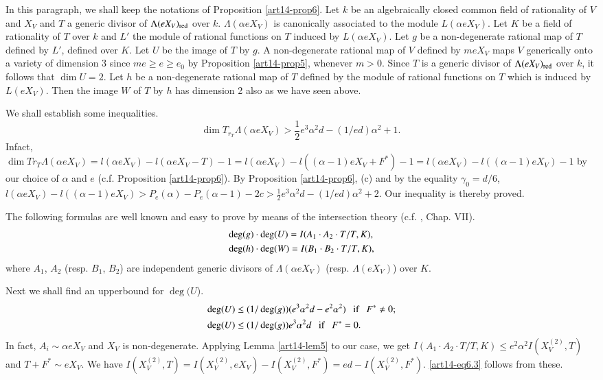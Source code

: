 In this paragraph, we shall keep the notations of Proposition \ref{art14-prop6}. Let $k$ be an algebraically closed common field of rationality of $V$ and $X_{V}$ and $T$ a generic divisor of $\Lambda(eX_{V})_{\operatorname{\mathrm{red}}}$ over $k$. $\Lambda(\alpha eX_{V})$ is canonically associated to the module $L(\alpha eX_{V})$. Let $K$ be a field of rationality of $T$ over $k$ and $L'$ the module of rational functions on $T$ induced by $L(\alpha eX_{V})$. Let $g$ be a non-degenerate rational map of $T$ defined by $L'$, defined over $K$. Let $U$ be the image of $T$ by $g$. A non-degenerate rational map of $V$ defined by $meX_{V}$ maps $V$ generically onto a variety of dimension 3 since $me\geq e\geq e_{0}$ by Proposition \ref{art14-prop5}, whenever $m>0$. Since $T$ is a generic divisor of $\Lambda(eX_{V})_{\operatorname{\mathrm{red}}}$ over $k$, it follows that $\dim U=2$. Let $h$ be a non-degenerate rational map of $T$ defined by the module of rational functions on $T$ which is induced by $L(eX_{V})$. Then the image $W$ of $T$ by $h$ has dimension 2 also as we have seen above.

We shall establish some inequalities.
\begin{equation}
\dim T_{r_{T}}\Lambda (\alpha eX_{V})>\frac{1}{2}e^{3}\alpha^{2}d-(1/ed)\alpha^{2}+1.\label{art14-eq6.1}
\end{equation}
In\pageoriginale fact, $\dim Tr_{T}\Lambda(\alpha eX_{V})=l(\alpha eX_{V})-l(\alpha eX_{V}-T)-1=l(\alpha eX_{V})-l((\alpha-1)eX_{V}+F^{*})-1=l(\alpha eX_{V})-l((\alpha-1)eX_{V})-1$ by our choice of $\alpha$ and $e$ (c.f. Proposition \ref{art14-prop6}). By Proposition \ref{art14-prop6}, (c) and by the equality $\gamma_{0}=d/6$, $l(\alpha eX_{V})-l((\alpha-1)eX_{V})>P_{e}(\alpha)-P_{e}(\alpha-1)-2c>\frac{1}{2}e^{3}\alpha^{2}d-(1/ed)\alpha^{2}+2$. Our inequality is thereby proved.

The following formulas are well known and easy to prove by means of the intersection theory (c.f. \cite{art14-key25}, Chap. VII).
\begin{align}
& \deg (g)\cdot \deg (U)=I(A_{1}\cdot A_{2}\cdot T/T,K),\notag\\
& \deg (h)\cdot \deg (W) = I(B_{1}\cdot B_{2}\cdot T/T,K),\label{art14-eq6.2}
\end{align}
where $A_{1}$, $A_{2}$ (resp. $B_{1}$, $B_{2}$) are independent generic divisors of $\Lambda (\alpha eX_{V})$ (resp. $\Lambda (eX_{V})$) over $K$.

Next we shall find an upperbound for $\deg(U$).
\begin{align}
& \deg (U)\leq (1/\deg(g))(e^{3}\alpha^{2}d-e^{2}\alpha^{2})\text{~~ if~~ } F^{*}\neq 0;\label{art14-eq6.3}\\
& \deg (U)\leq (1/\deg (g))e^{3}\alpha^{2}d\text{~~ if~~ } F^{*}=0.\notag
\end{align}
In fact, $A_{i}\sim \alpha eX_{V}$ and $X_{V}$ is non-degenerate. Applying Lemma \ref{art14-lem5} to our case, we get $I(A_{1}\cdot A_{2}\cdot T/T,K)\leq e^{2}\alpha^{2}I(X^{(2)}_{V}, T)$ and $T+F^{*}\sim eX_{V}$. We have $I(X^{(2)}_{V},T)=I(X^{(2)}_{V},eX_{V})-I(X^{(2)}_{V},F^{*})=ed-I(X^{(2)}_{V},F^{*})$. \eqref{art14-eq6.3} follows from these.

